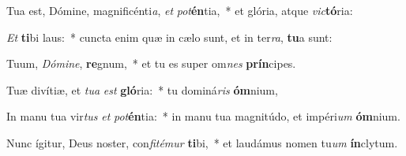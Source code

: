 \item Tua est, Dómine, magnificénti\textit{a}, \textit{et} \textit{pot}\textbf{én}tia,~* et glória, atque \textit{vic}\textbf{tó}ria:
\item \textit{Et} \textbf{ti}bi laus:~* cuncta enim quæ in cælo sunt, et in ter\textit{ra}, \textbf{tu}a sunt:
\item Tuum, \textit{Dó}\textit{mi}\textit{ne}, \textbf{re}gnum,~* et tu es super om\textit{nes} \textbf{prín}cipes.
\item Tuæ divítiæ, et \textit{tu}\textit{a} \textit{est} \textbf{gló}ria:~* tu dominá\textit{ris} \textbf{óm}nium,
\item In manu tua vir\textit{tus} \textit{et} \textit{pot}\textbf{én}tia:~* in manu tua magnitúdo, et impéri\textit{um} \textbf{óm}nium.
\item Nunc ígitur, Deus noster, con\textit{fi}\textit{té}\textit{mur} \textbf{ti}bi,~* et laudámus nomen tu\textit{um} \textbf{ín}clytum.

